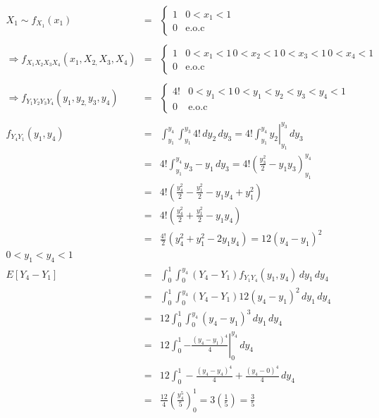 \begin{enumerate}
\begin{eqnarray*}
X_{1} \sim f_{X_{1}} \left(x_{1} \right) &=& \begin{cases}
1  & 0 < x_{1} < 1 \\
0 &  \textrm{e.o.c} 
\end{cases}  \\\\
\Rightarrow  f_{X_{1}X_{2}X_{3}X_{4}} \left(x_{1},X_{2,}X_{3},X_{4} \right) &=& \begin{cases}
1  & 0 < x_{1} < 1 \, 0 < x_{2} < 1 \, 0 < x_{3} < 1 \, 0 < x_{4} < 1 \\
0 &  \textrm{e.o.c} 
\end{cases} \\\\
\Rightarrow  f_{Y_{1}Y_{2}Y_{3}Y_{4}} \left(y_{1},y_{2,}y_{3},y_{4} \right) &=& \begin{cases}
4!  & 0 < y_{1} < 1 \, 0 < y_{1}<y_{2}<y_{3}<y_{4} < 1 \\
0 &  \textrm{e.o.c} 
\end{cases}\\\\
f_{Y_{4}Y_{1}} \left(y_{1}, y_{4} \right) &=& \int _{y_{1}}^{y_{4}} \int _{y_{1}}^{y_{3}} 4! \, dy_{2}\, dy_{3} = \left. 4! \int _{y_{1}}^{y_{4}} y_{2} \right| _{y_{1}}^{y_{3}}\, dy_{3}\\
&=& 4! \int _{y_{1}}^{y_{4}} y_{3}- y_{1} \, dy_{3}= 4! \left(\frac{y_{3}^2}{2}-y_{1} y_{3} \right)_{y_{1}}^{y_{4}}\\
&=& 4! \left(\frac{y_{4}^2}{2} - \frac{y_{1}^2}{2}- y_{1}y_{4} +  y_{1}^2 \right)\\
&=& 4! \left(\frac{y_{4}^2}{2} + \frac{y_{1}^2}{2}- y_{1}y_{4} \right)\\
&=& \frac{4!}{2} \left(y_{4}^2+ y_{1}^2 -2y_{1}y_{4}\right) = 12 \left(y_{4}-y_{1} \right)^2 \\
0<y_{1}< y_{4}<1\\
E \left[Y_{4}- Y_{1} \right] &=& \int_{0}^{1} \int_{0}^{y_{4}} \left(Y_{4}-Y_{1} \right)f_{Y_{1}Y_{4}} \left(y_{1}, y_{4} \right) \, dy_{1} \, dy_{4}\\
&=&\int_{0}^{1} \int_{0}^{y_{4}} \left(Y_{4}-Y_{1} \right)12 \left(y_{4}- y_{1} \right)^2 \, dy_{1} \, dy_{4}\\
&=& 12 \int_{0}^{1} \int_{0}^{y_{4}}  \left(y_{4}- y_{1} \right)^3 \, dy_{1} \, dy_{4}\\
&=& 12 \int_{0}^{1}\left. - \frac{ \left(y_{4}-y_{1} \right)^4 }{ 4} \right| _{0}^{y_{4}} \, dy_{4}\\
&=& 12 \int _{0}^{1}  - \frac{ \left(y_{4}-y_{4} \right)^4 }{ 4} +  \frac{ \left(y_{4}-0 \right)^4 }{ 4} \, dy_{4}\\
&=& \frac{12}{4} \left(\frac{y_{4}^5}{5} \right)_{0} ^{1} = 3 \left(\frac{1}{5} \right) = \frac{3}{5}
\end{eqnarray*}


\end{enumerate}
